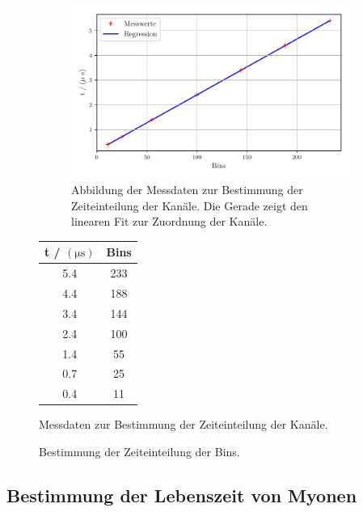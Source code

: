 \begin{figure}%
    \begin{subfigure}{0.68\textwidth}%
    \centering%
    \includegraphics[width=\textwidth]{build/zeiteinteilung.pdf}%
    \caption{Abbildung der Messdaten zur Bestimmung der Zeiteinteilung der Kanäle. Die Gerade zeigt den linearen Fit zur Zuordnung der Kanäle.}%
    \label{fig:zeiteinteilung}%
    \end{subfigure}%
    \hfill%
    \begin{subtable}{0.28\textwidth}%
        \centering
        \begin{tabular}{c c}
        \toprule
        t / $(\unit{\micro\second})$ &  Bins \\
        \midrule
         5.4 & 233 \\
         4.4 & 188 \\
         3.4 & 144 \\
         2.4 & 100 \\
         1.4 &  55 \\
         0.7 &  25 \\
         0.4 &  11 \\
        \bottomrule
        \end{tabular}
        \caption{Messdaten zur Bestimmung der Zeiteinteilung der Kanäle.}
        \label{tab:zeiteinteilung}
    \end{subtable}%
    \caption{Bestimmung der Zeiteinteilung der Bins.}
    \label{subfig:zeiteinteilung}    
\end{figure}%
    
\subsection{Bestimmung der Lebenszeit von Myonen}


